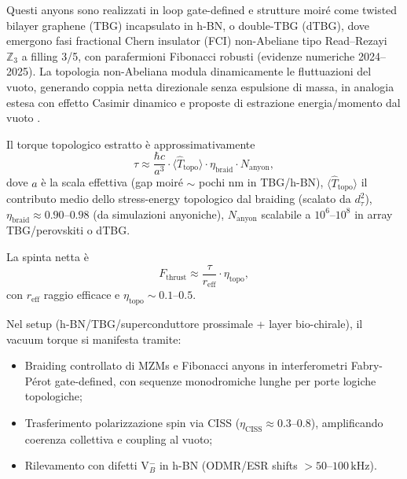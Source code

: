 \documentclass[11pt,a4paper]{article}
\let\oldcite\cite
\renewcommand{\cite}{\protect\oldcite}
\theoremstyle{plain}
\theoremstyle{definition}
\begin{document}
\vspace{0.4cm}

Questi anyons sono realizzati in loop gate-defined e strutture moiré come twisted bilayer graphene (TBG) incapsulato in h-BN, o double-TBG (dTBG), dove emergono fasi fractional Chern insulator (FCI) non-Abeliane tipo Read–Rezayi $\mathbb{Z}_3$ a filling 3/5, con parafermioni Fibonacci robusti (evidenze numeriche 2024–2025). La topologia non-Abeliana modula dinamicamente le fluttuazioni del vuoto, generando coppia netta direzionale senza espulsione di massa, in analogia estesa con effetto Casimir dinamico e proposte di estrazione energia/momento dal vuoto \cite{wilson2011observation, forbes2019dynamical, marachevsky2024casimir, carney2022gravitational, xu2024non}.

Il torque topologico estratto è approssimativamente
\begin{equation}
\tau \approx \frac{\hbar c}{a^3} \cdot \langle \hat{T}_{\mathrm{topo}} \rangle \cdot \eta_{\mathrm{braid}} \cdot N_{\mathrm{anyon}},
\label{eq:vacuum_torque}
\end{equation}
dove $a$ è la scala effettiva (gap moiré $\sim$ pochi nm in TBG/h-BN), $\langle \hat{T}_{\mathrm{topo}} \rangle$ il contributo medio dello stress-energy topologico dal braiding (scalato da $d_\tau^2$), $\eta_{\mathrm{braid}} \approx 0.90$--$0.98$ (da simulazioni anyoniche), $N_{\mathrm{anyon}}$ scalabile a $10^6$--$10^8$ in array TBG/perovskiti o dTBG.

La spinta netta è
\begin{equation}
F_{\mathrm{thrust}} \approx \frac{\tau}{r_{\mathrm{eff}}} \cdot \eta_{\mathrm{topo}},
\label{eq:thrust_netto}
\end{equation}
con $r_{\mathrm{eff}}$ raggio efficace e $\eta_{\mathrm{topo}} \sim 0.1$--$0.5$.

Nel setup (h-BN/TBG/superconduttore prossimale + layer bio-chirale), il vacuum torque si manifesta tramite:
\begin{itemize}
    \item Braiding controllato di MZMs e Fibonacci anyons in interferometri Fabry-Pérot gate-defined, con sequenze monodromiche lunghe per porte logiche topologiche;
    \item Trasferimento polarizzazione spin via CISS ($\eta_{\mathrm{CISS}} \approx 0.3$--$0.8$), amplificando coerenza collettiva e coupling al vuoto;
    \item Rilevamento con difetti V$_B^-$ in h-BN (ODMR/ESR shifts $>50$--$100\,\mathrm{kHz}$).
\end{itemize}
\end{document}
